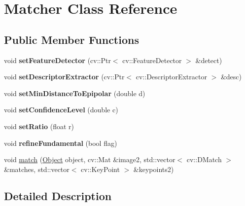 \hypertarget{class_matcher}{
\section{Matcher Class Reference}
\label{class_matcher}
}
\subsection*{Public Member Functions}
\begin{DoxyCompactItemize}
\item 
\hypertarget{class_matcher_a951934bb0f9acf449db189aaf53f47f3}{
void {\bfseries setFeatureDetector} (cv::Ptr$<$ cv::FeatureDetector $>$ \&detect)}
\label{class_matcher_a951934bb0f9acf449db189aaf53f47f3}

\item 
\hypertarget{class_matcher_a8c6f8fea14e3fb4a34d376b54e4f2c32}{
void {\bfseries setDescriptorExtractor} (cv::Ptr$<$ cv::DescriptorExtractor $>$ \&desc)}
\label{class_matcher_a8c6f8fea14e3fb4a34d376b54e4f2c32}

\item 
\hypertarget{class_matcher_abdb4da826fd6dea068a6fcd25330b6e7}{
void {\bfseries setMinDistanceToEpipolar} (double d)}
\label{class_matcher_abdb4da826fd6dea068a6fcd25330b6e7}

\item 
\hypertarget{class_matcher_a07594c2042c8b1ffa18f05094d2ebd1f}{
void {\bfseries setConfidenceLevel} (double c)}
\label{class_matcher_a07594c2042c8b1ffa18f05094d2ebd1f}

\item 
\hypertarget{class_matcher_a184ceacdf40557d0708d4a25cfd77b76}{
void {\bfseries setRatio} (float r)}
\label{class_matcher_a184ceacdf40557d0708d4a25cfd77b76}

\item 
\hypertarget{class_matcher_a1159c04134ec932d9dab01f029e946a6}{
void {\bfseries refineFundamental} (bool flag)}
\label{class_matcher_a1159c04134ec932d9dab01f029e946a6}

\item 
void \hyperlink{class_matcher_a17554d153e3559c7ebe668ba5ea8971b}{match} (\hyperlink{class_object}{Object} object, cv::Mat \&image2, std::vector$<$ cv::DMatch $>$ \&matches, std::vector$<$ cv::KeyPoint $>$ \&keypoints2)
\end{DoxyCompactItemize}


\subsection{Detailed Description}


